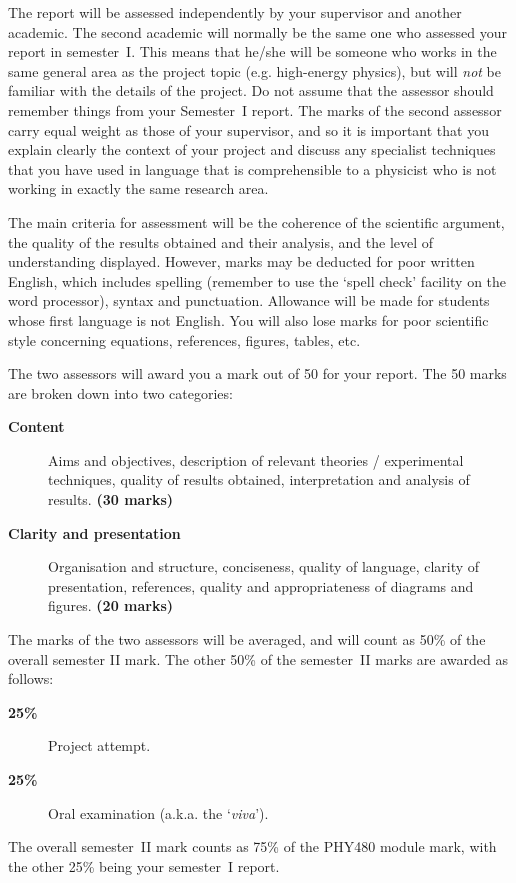 \documentclass[a4paper,fleqn,usenatbib]{mnras}
\begin{document}
The report will be assessed independently by your supervisor and another academic. The second academic will normally be the same one who assessed your report in semester~I. This means that he/she will be someone who works in the same general area as the project topic (e.g. high-energy physics), but will {\em not} be familiar with the details of the project. Do not assume that the assessor should remember things from your Semester~I report. The marks of the second assessor carry equal weight as those of your supervisor, and so it is important that you explain clearly the context of your project and discuss any specialist techniques that you have used in language that is comprehensible to a physicist who is not working in exactly the same research area.



The main criteria for assessment will be the coherence of the scientific argument, the quality of the results obtained and their analysis, and the level of understanding displayed. However, marks may be deducted for poor written English, which  includes spelling (remember to use the `spell check' facility on the word processor), syntax and punctuation. Allowance will be made for students whose first language is not English. You will also lose marks for poor scientific style concerning equations, references, figures, tables, etc. 

The two assessors will award you a mark out of 50 for your report. The 50 marks are broken down into two categories:
\begin{description}
\item[\textbf{Content}] Aims and objectives, description of relevant theories / experimental techniques, quality of results obtained, interpretation and analysis of results.
 \textbf{(30 marks)}
\item[\textbf{Clarity and presentation}] Organisation and structure, conciseness, quality of language, clarity of presentation, references, quality and appropriateness of diagrams and figures.
 \textbf{(20 marks)}
\end{description}
The marks of the two assessors will be averaged, and will count as 50\% of the overall semester II mark. The other 50\% of the semester~II marks are awarded as follows:
\begin{description}
\item[\textbf{25\%}] Project attempt.
\item[\textbf{25\%}] Oral examination (a.k.a. the `\textit{viva}').
\end{description}
The overall semester~II mark counts as 75\% of the PHY480 module mark, with the other 25\% being your semester~I report. 
\end{document}
